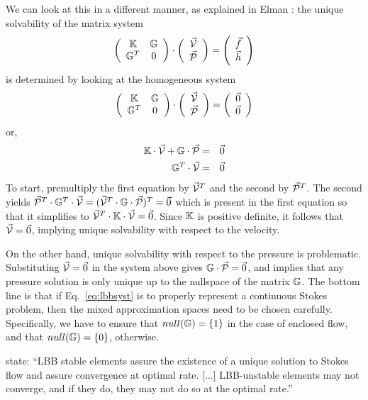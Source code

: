 We can look at this in a different manner, as explained in Elman \etal \cite{elsw}:
the unique solvability of the matrix system
\begin{equation}
\left(
\begin{array}{cc}
{\mathbb{K}} & {\mathbb{G}} \\
{\mathbb{G}}^T & 0 
\end{array}
\right)
\cdot 
\left(
\begin{array}{c}
\vec{\cal V} \\ \vec{\cal P}
\end{array}
\right)
=
\left(
\begin{array}{c}
\vec{f} \\ \vec{h}
\end{array}
\right)
\label{eq:lbbsyst}
\end{equation}
is determined by looking at the homogeneous system
\begin{equation}
\left(
\begin{array}{cc}
{\mathbb{K}} & {\mathbb{G}} \\
{\mathbb{G}}^T & 0 
\end{array}
\right)
\cdot 
\left(
\begin{array}{c}
\vec{\cal V} \\ \vec{\cal P}
\end{array}
\right)
=
\left(
\begin{array}{c}
\vec{0} \\ \vec{0}
\end{array}
\right)
\end{equation}
or,
\begin{eqnarray}
{\mathbb{K}} \cdot \vec{\cal V} + {\mathbb{G}} \cdot \vec{\cal P} &=& \vec{0} \nonumber\\
{\mathbb{G}}^T \cdot \vec{\cal V} &=& \vec{0}
\end{eqnarray}
To start, premultiply the first equation by $\vec{\cal V}^T$ and the second by 
$\vec{\cal P}^T$. The second yields
$\vec{\cal P}^T \cdot {\mathbb{G}}^T \cdot \vec{\cal V} = ( \vec{\cal V}^T \cdot {\mathbb{G}}\cdot \vec{\cal P}  )^T = \vec{0}$
which is present in the first equation so that it simplifies to $\vec{\cal V}^T\cdot {\mathbb{K}} \cdot \vec{\cal V} = \vec{0}$.
Since ${\mathbb{K}}$ is positive definite, it follows that $\vec{\cal V}=\vec{0}$, implying unique solvability
with respect to the velocity. 

On the other hand, unique solvability with respect to the pressure is problematic. Substituting $\vec{\cal V}=\vec{0}$
in the system above gives ${\mathbb{G}} \cdot \vec{\cal P} = \vec{0}$, and implies that any pressure solution is only unique 
up to the nullspace of the matrix ${\mathbb{G}}$. 
The bottom line is that if Eq.~\eqref{eq:lbbsyst} is to properly represent a continuous Stokes
problem, then the mixed approximation spaces need to be chosen carefully.
Specifically, we have to ensure that $null({\mathbb{G}})=\{1\}$ in the case of enclosed flow,
and that $null({\mathbb{G}})=\{0\}$, otherwise.

\textcite{grsa} state: ``LBB stable elements assure the existence of a unique solution to Stokes flow and 
assure convergence at optimal rate. [...] LBB-unstable elements may not converge, and if they do, they may not do so at the optimal rate.''

